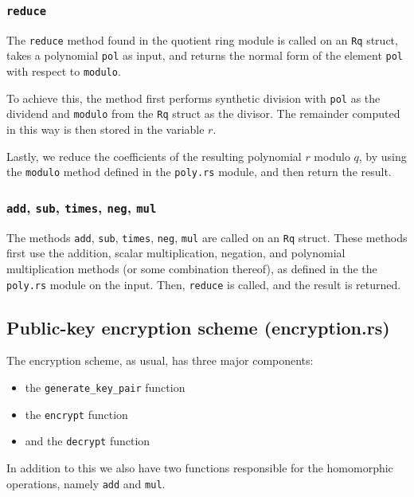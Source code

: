 \documentclass[../main.tex]{subfiles}
\begin{document}
\subsubsection{\lstinline{reduce}}

The \lstinline{reduce} method found in the quotient ring module is called on an \lstinline{Rq} struct, takes a polynomial \lstinline{pol} as input, and returns the normal form of the element \lstinline{pol} with respect to \lstinline{modulo}.

To achieve this, the method first performs synthetic division with \lstinline{pol} as the dividend and \lstinline{modulo} from the \lstinline{Rq} struct as the divisor. The remainder computed in this way is then stored in the variable $r$.

Lastly, we reduce the coefficients of the resulting polynomial $r$ modulo $q$, by using the \lstinline{modulo} method defined in the \lstinline{poly.rs} module, and then return the result.

\subsubsection{\lstinline{add}, \lstinline{sub}, \lstinline{times}, \lstinline{neg}, \lstinline{mul}}

The methods \lstinline{add}, \lstinline{sub}, \lstinline{times}, \lstinline{neg}, \lstinline{mul} are called on an \lstinline{Rq} struct.
These methods first use the addition, scalar multiplication, negation, and polynomial multiplication methods (or some combination thereof), as defined in the the \lstinline{poly.rs} module on the input.
Then, \lstinline{reduce} is called, and the result is returned.

\subsection{Public-key encryption scheme (encryption.rs)}

The encryption scheme, as usual, has three major components:

\begin{itemize}
  \item the \lstinline{generate_key_pair} function
  \item the \lstinline{encrypt} function
  \item and the \lstinline{decrypt} function
\end{itemize}

In addition to this we also have two functions responsible for the homomorphic operations, namely \lstinline{add} and \lstinline{mul}.
\end{document}
